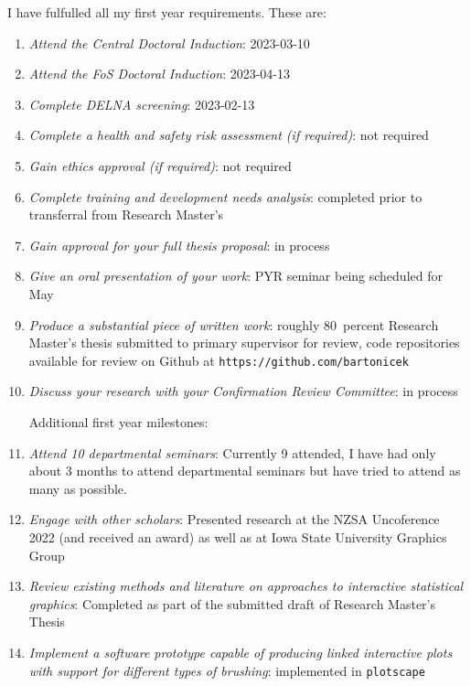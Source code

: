 \documentclass[12pt,a4paper]{article}
\begin{document}
I have fulfulled all my first year requirements. These are:

\begin{enumerate}

\item \textit{Attend the Central Doctoral Induction}: 2023-03-10
\item \textit{Attend the FoS Doctoral Induction}: 2023-04-13
\item \textit{Complete DELNA screening}: 2023-02-13
\item \textit{Complete a health and safety risk assessment (if required)}: not required
\item \textit{Gain ethics approval (if required)}: not required
\item \textit{Complete training and development needs analysis}: completed prior to transferral from Research Master's
\item \textit{Gain approval for your full thesis proposal}: in process
\item \textit{Give an oral presentation of your work}: PYR seminar being scheduled for May
\item \textit{Produce a substantial piece of written work}: roughly 80~percent Research Master's thesis submitted to primary supervisor for review, 
code repositories available for review on Github at \texttt{https://github.com/bartonicek}
\item \textit{Discuss your research with your Confirmation Review Committee}: in process \newline \newline

Additional first year milestones:

\item \textit{Attend 10 departmental seminars}: Currently 9 attended, I have had only about 3 months to attend departmental seminars but have tried to attend as many as possible.
\item \textit{Engage with other scholars}: Presented research at the NZSA Uncoference 2022 (and received an award) as well as at Iowa State University Graphics Group
\item \textit{Review existing methods and literature on approaches to interactive statistical graphics}: Completed as part of the submitted draft of Research Master's Thesis
\item \textit{Implement a software prototype capable of producing linked interactive plots with support for different types of brushing}: implemented in \texttt{plotscape}


\end{enumerate}
\end{document}
